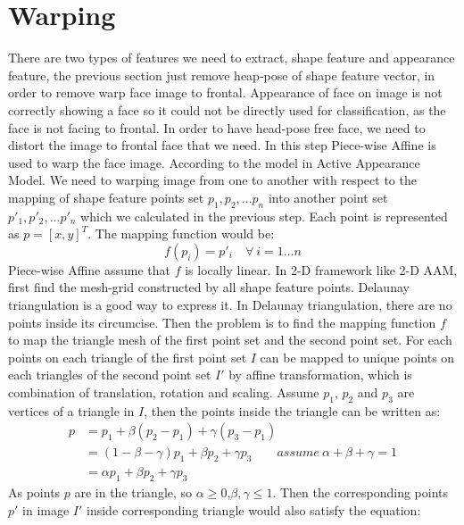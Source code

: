 \section{Warping}
There are two types of features we need to extract, shape feature and appearance feature, the previous section just remove heap-pose of shape feature vector, in order to remove warp face image to frontal. Appearance of face on image is not correctly showing a face so it could not be directly used for classification, as the face is not facing to frontal. In order to have head-pose free face, we need to distort the image to frontal face that we need. In this step Piece-wise Affine\cite{AAMWarp} is used to warp the face image. According to the model in Active Appearance Model. We need to warping image from one to another with respect to the mapping of shape feature points set ${p_{1}, p_{2}, ...p_{n}}$ into another point set ${p'_{1}, p'_{2}, ... p'_{n}}$ which we calculated in the previous step. Each point is represented as $p = [x,y]^{T}$. The mapping function would be:
\begin{equation}
f(p_{i}) = p'_{i} \quad \forall \ i = 1...n
\label{eq:W1}
\end{equation}
\newline
Piece-wise Affine assume that $f$ is locally linear. In 2-D framework like 2-D AAM, first find the mesh-grid constructed by all shape feature points. Delaunay triangulation is a good way to express it. In Delaunay triangulation, there are no points inside its circumcise. Then the problem is to find the mapping function $f$ to map the triangle mesh of the first point set and the second point set. For each points on each triangle of the first point set $I$ can be mapped to unique points on each triangles of the second point set $I'$ by affine transformation, which is combination of translation, rotation and scaling. Assume $p_{1}$, $p_{2}$ and $p_{3}$ are vertices of a triangle in $I$, then the points inside the triangle can be written as:
\begin{equation}
\begin{split}
p 
& = p_{1} + \beta (p_{2}-p_{1})+\gamma (p_{3}-p_{1}) \\
& = (1-\beta-\gamma)p_{1} + \beta p_{2} + \gamma p_{3} \quad \quad assume \: \alpha + \beta + \gamma = 1\\
&  = \alpha p_{1} + \beta p_{2} + \gamma p_{3}
\end{split}
\end{equation}
\newline
As points $p$ are in the triangle, so $\alpha\geq 0$,$\beta,\gamma \leq 1$. Then the corresponding points $p'$ in image $I'$ inside corresponding triangle would also satisfy the equation:
